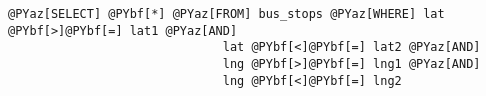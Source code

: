 \begin{Verbatim}[commandchars=@\[\]]
@PYaz[SELECT] @PYbf[*] @PYaz[FROM] bus_stops @PYaz[WHERE] lat @PYbf[>]@PYbf[=] lat1 @PYaz[AND]
                              lat @PYbf[<]@PYbf[=] lat2 @PYaz[AND]
                              lng @PYbf[>]@PYbf[=] lng1 @PYaz[AND]
                              lng @PYbf[<]@PYbf[=] lng2
\end{Verbatim}
